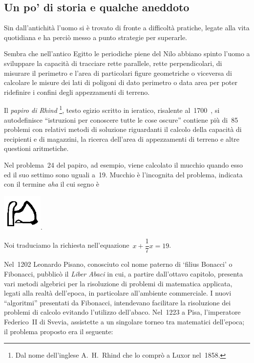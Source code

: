 \subsection{Un po' di storia e qualche aneddoto}
\label{subsec:equazioni_problemi_storia}

Sin dall'antichità l'uomo si è
trovato di fronte a difficoltà pratiche, legate alla vita quotidiana
e ha perciò messo a punto strategie per superarle.

Sembra che nell'antico Egitto le periodiche piene del
Nilo abbiano spinto l'uomo a sviluppare la capacità
di tracciare rette parallele, rette perpendicolari, di misurare il
perimetro e l'area di particolari figure geometriche o
viceversa di calcolare le misure dei lati di poligoni di dato perimetro
o data area per poter ridefinire i confini degli appezzamenti di
terreno.

Il \emph{papiro di Rhind}
\footnote{Dal nome dell'inglese A.~H.~Rhind che lo comprò a Luxor nel~1858.}, 
testo egizio scritto in
ieratico, risalente al~1700~\aC, si autodefinisce
``istruzioni per conoscere tutte le cose
oscure'' contiene più di~85 problemi con relativi
metodi di soluzione riguardanti il calcolo della capacità di
recipienti e di magazzini, la ricerca dell'area di
appezzamenti di terreno e altre questioni aritmetiche.

Nel problema~24 del papiro, ad esempio, viene calcolato il mucchio
quando esso ed il suo settimo sono uguali a~19. Mucchio è
l'incognita del problema, indicata con il termine
\emph{aha} il cui segno è
% 
\begin{inaccessibleblock}[Geroglifico]
 \includegraphics[scale=0.28]{img/giero.png}.
\end{inaccessibleblock}
                                                                  
Noi traduciamo la richiesta nell'equazione~\(x+\dfrac{1}{7}x=19\).

Nel~1202 Leonardo Pisano, conosciuto col nome paterno di
`filius Bonacci' o Fibonacci, pubblicò il
\emph{Liber Abaci} in cui, a partire dall'ottavo
capitolo, presenta vari metodi algebrici per la risoluzione di problemi
di matematica applicata, legati alla realtà
dell'epoca, in particolare
all'ambiente commerciale. I nuovi
``algoritmi'' presentati da Fibonacci,
intendevano facilitare la risoluzione dei problemi di calcolo evitando
l'utilizzo dell'abaco. Nel~1223 a
Pisa, l'imperatore Federico~II di Svevia, assistette a
un singolare torneo tra matematici dell'epoca; il
problema proposto era il seguente:


